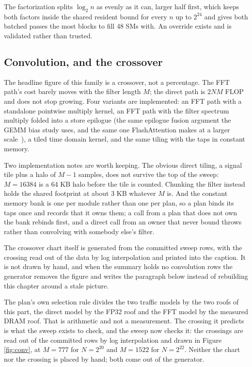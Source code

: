 The factorization splits $\log_2 n$ as evenly as it can, larger half first, which
keeps both factors inside the shared resident bound for every $n$ up to $2^{24}$
and gives both batched passes the most blocks to fill 48 SMs with. An override
exists and is validated rather than trusted.

\subsection{Convolution, and the crossover}

The headline figure of this family is a crossover, not a percentage. The FFT
path's cost barely moves with the filter length $M$; the direct path is $2NM$ FLOP
and does not stop growing. Four variants are implemented: an FFT path with a
standalone pointwise multiply kernel, an FFT path with the filter spectrum multiply
folded into a store epilogue (the same epilogue fusion argument the GEMM bias study
uses, and the same one FlashAttention makes at a larger scale~\cite{dao2022}), a
tiled time domain kernel, and the same tiling with the taps in constant memory.

Two implementation notes are worth keeping. The obvious direct tiling, a signal
tile plus a halo of $M-1$ samples, does not survive the top of the sweep:
$M = 16384$ is a 64 KB halo before the tile is counted. Chunking the filter instead
holds the shared footprint at about 3 KB whatever $M$ is. And the constant memory
bank is one per module rather than one per plan, so a plan binds its taps once and
records that it owns them; a call from a plan that does not own the bank rebinds
first, and a direct call from an owner that never bound throws rather than
convolving with somebody else's filter.

The crossover chart itself is generated from the committed sweep rows, with the
crossing read out of the data by log interpolation and printed into the caption. It
is not drawn by hand, and when the summary holds no convolution rows the generator
removes the figure and writes the paragraph below instead of rebuilding this
chapter around a stale picture.



The plan's own selection rule divides the two traffic models by the two roofs of
this part, the direct model by the FP32 roof and the FFT model by the measured DRAM
roof. That is arithmetic and not a measurement. The crossing it predicts is what
the sweep exists to check, and the sweep now checks it: the crossings are read out
of the committed rows by log interpolation and drawn in Figure \ref{fig:conv}, at
$M = 777$ for $N = 2^{20}$ and $M = 1522$ for $N = 2^{22}$. Neither the chart nor
the crossing is placed by hand; both come out of the generator.

